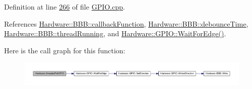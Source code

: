 Definition at line \hyperlink{_g_p_i_o_8cpp_source_l00266}{266} of file \hyperlink{_g_p_i_o_8cpp_source}{G\+P\+I\+O.\+cpp}.



References \hyperlink{_b_b_b_8h_source_l00050}{Hardware\+::\+B\+B\+B\+::callback\+Function}, \hyperlink{_b_b_b_8h_source_l00042}{Hardware\+::\+B\+B\+B\+::debounce\+Time}, \hyperlink{_b_b_b_8h_source_l00048}{Hardware\+::\+B\+B\+B\+::thread\+Running}, and \hyperlink{_g_p_i_o_8cpp_source_l00037}{Hardware\+::\+G\+P\+I\+O\+::\+Wait\+For\+Edge()}.



Here is the call graph for this function\+:
\nopagebreak
\begin{figure}[H]
\begin{center}
\leavevmode
\includegraphics[width=350pt]{namespace_hardware_af5f1bde915012872fc6b800981948aaa_cgraph}
\end{center}
\end{figure}


